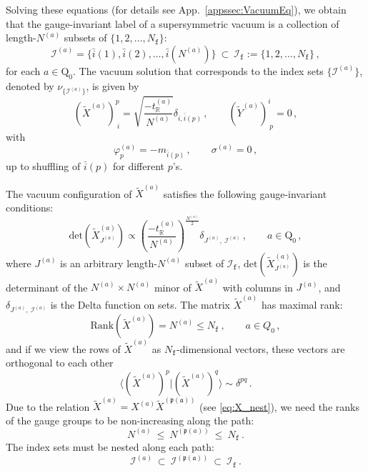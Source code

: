 \documentclass[12pt,a4paper]{article}
\renewcommand{\(}{\left(}
\renewcommand{\)}{\right)}
\renewcommand{\(}{\left(}
\renewcommand{\)}{\right)}
\begin{document}
\medskip
Solving these equations (for details see App.~\ref{appssec:VacuumEq}), we obtain that the gauge-invariant label of a supersymmetric vacuum is a collection of length-$N^{(a)}$ subsets of $\{1,2,\dots,N_\mathtt{f}\}$: 
\begin{equation}\label{eq:vacua_index_sets}
\mathcal{I}^{(a)}=\{\bar{i}(1),\bar{i}(2),\dots,\bar{i}(N^{(a)})\} 
\ \subset \
\mathcal{I}_{\mathtt{f}}:=\{1,2,\dots,N_\mathtt{f}\}\,,
\end{equation}
for each $a\in \mathrm{Q}_0$.
The vacuum solution that corresponds to the index sets $\{\mathcal{I}^{(a)}\}$, denoted by $\nu_{\{\mathcal{I}^{(a)}\}}$, is given by 
\begin{equation}\label{eq:vacuaSol}  
(\tilde{X}^{(a)})^p_{\ i}=\sqrt{\frac{-t^{(a)}_\mathbb{R}}{N^{(a)}}}\delta_{i,\bar{i}(p)}\,, \qquad (\tilde{Y}^{(a)})^i_{\ p}=0\,,
\end{equation}
with 
\begin{equation}\label{eq:vacuaSolconstraint} 
\varphi^{(a)}_p=-m_{\bar{i}(p)}\,, \qquad  \sigma^{(a)}=0\,,
\end{equation}
up to shuffling of $\bar{i}(p)$ for different $p$'s. 

\medskip

The vacuum configuration of $\tilde{X}^{(a)}$ satisfies the following gauge-invariant conditions:
\begin{equation}\label{eq:vacuum_condition}
\text{det}(\tilde{X}^{(a)}_{J^{(a)}})\propto \left(\frac{-t^{(a)}_{\mathbb{R}}}{N^{(a)}}\right)^{\frac{N^{(a)}}{2}}\delta_{J^{(a)},\ \mathcal{I}^{(a)}}\,, \qquad a\in \textrm{Q}_0\,,
\end{equation}
where $J^{(a)}$ is an arbitrary length-$N^{(a)}$ subset of $\mathcal{I}_{\mathtt{f}}$, $\text{det}(\tilde{X}^{(a)}_{J^{(a)}})$ is the determinant of the $N^{(a)}\times N^{(a)}$ minor of $\tilde{X}^{(a)}$ with columns in $J^{(a)}$, and $\delta_{J^{(a)},\ \mathcal{I}^{(a)}}$ is the Delta function on sets.
The matrix $\tilde{X}^{(a)}$ has maximal rank:
\begin{equation}
\text{Rank}(\tilde{X}^{(a)})=N^{(a)} \leq N_{\mathtt{f}}\,,\qquad a\in Q_0\,,
\end{equation}
and if we view the rows of $\tilde{X}^{(a)}$ as $N_{\mathtt{f}}$-dimensional vectors, these vectors are orthogonal to each other
\begin{equation}\langle (\tilde{X}^{(a)})^p|(\tilde{X}^{(a)})^q\rangle\sim\delta^{pq}\,.
\end{equation}
Due to the relation $\tilde{X}^{(a)}=X^{(a)}\tilde{X}^{(\mathfrak{p(a)})}$ (see \eqref{eq:X_nest}), we need the ranks of the gauge groups to be non-increasing along the path:
\begin{equation}\label{eq:Nanon-increase}
N^{(a)}
\ \leq \ 
N^{(\mathfrak{p}(a))} 
\ \leq \ 
N_{\mathtt{f}}\,.    
\end{equation}
The index sets must be nested along each path:
\begin{equation}
\mathcal{I}^{(a)}
\ \subset \
\mathcal{I}^{(\mathfrak{p(a)})}
\ \subset \
\mathcal{I}_{\mathtt{f}} \,.
\end{equation}
\end{document}
